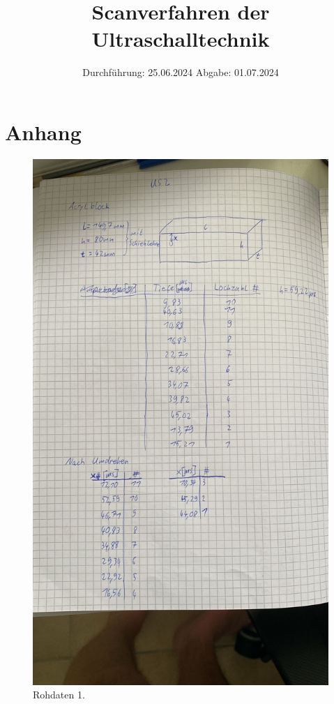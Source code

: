 

\subject{VUS2}
\title{Scanverfahren der Ultraschalltechnik}
\date{%
  Durchführung: 25.06.2024
  \hspace{3em}
  Abgabe: 01.07.2024
}



\maketitle
\thispagestyle{empty}
\tableofcontents
\newpage






\printbibliography{}

\section{Anhang}
\begin{figure}[H]
  \includegraphics[width=\textwidth]{Bilder/messdaten1.jpg}
  \caption{Rohdaten 1.}
  \label{fig:1}
\end{figure}

